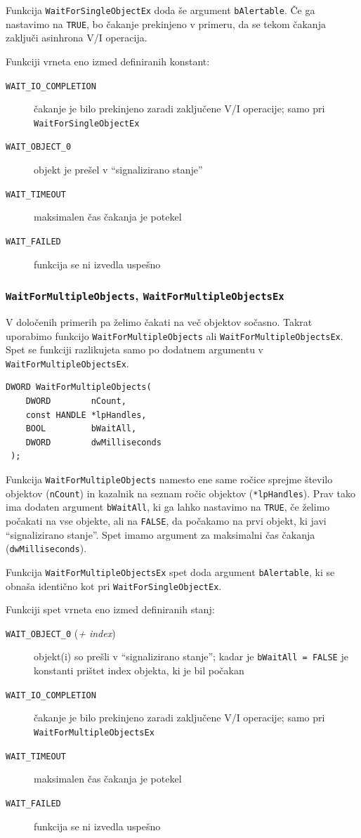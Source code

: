 \documentclass[a4paper,12pt,openright]{book}
\begin{document}
Funkcija \texttt{WaitForSingleObjectEx} doda še argument \texttt{bAlertable}.
Če ga nastavimo na \texttt{TRUE}, bo čakanje prekinjeno v primeru, da se tekom čakanja zaključi asinhrona V/I operacija.

Funkciji vrneta eno izmed definiranih konstant:
\begin{description}
	\item[\texttt{WAIT\_IO\_COMPLETION}] čakanje je bilo prekinjeno zaradi zaključene V/I operacije; samo pri \texttt{WaitForSingleObjectEx}
	\item[\texttt{WAIT\_OBJECT\_0}] objekt je prešel v ``signalizirano stanje''
	\item[\texttt{WAIT\_TIMEOUT}] maksimalen čas čakanja je potekel
	\item[\texttt{WAIT\_FAILED}] funkcija se ni izvedla uspešno
\end{description}

\subsubsection{\texttt{WaitForMultipleObjects}, \texttt{WaitForMultipleObjectsEx}}

V določenih primerih pa želimo čakati na več objektov sočasno.
Takrat uporabimo funkcijo \texttt{WaitForMultipleObjects} ali \texttt{WaitForMultipleObjectsEx}.
Spet se funkciji razlikujeta samo po dodatnem argumentu v \texttt{WaitForMultipleObjectsEx}.

\begin{lstlisting}[style=func]
 DWORD WaitForMultipleObjects(
	DWORD        nCount,
	const HANDLE *lpHandles,
	BOOL         bWaitAll,
	DWORD        dwMilliseconds
 );
\end{lstlisting}

Funkcija \texttt{WaitForMultipleObjects} namesto ene same ročice sprejme število objektov (\texttt{nCount}) in kazalnik na seznam ročic objektov (\texttt{*lpHandles}).
Prav tako ima dodaten argument \texttt{bWaitAll}, ki ga lahko nastavimo na \texttt{TRUE}, če želimo počakati na vse objekte, ali na \texttt{FALSE}, da počakamo na prvi objekt, ki javi ``signalizirano stanje''.
Spet imamo argument za maksimalni čas čakanja (\texttt{dwMilliseconds}).

Funkcija \texttt{WaitForMultipleObjectsEx} spet doda argument \texttt{bAlertable}, ki se obnaša identično kot pri \texttt{WaitForSingleObjectEx}.

Funkciji spet vrneta eno izmed definiranih stanj:
\begin{description}
	\item[\texttt{WAIT\_OBJECT\_0} (\textit{+ index})] objekt(i) so prešli v ``signalizirano stanje''; kadar je \texttt{bWaitAll = FALSE} je konstanti prištet index objekta, ki je bil počakan
	\item[\texttt{WAIT\_IO\_COMPLETION}] čakanje je bilo prekinjeno zaradi zaključene V/I operacije; samo pri \texttt{WaitForMultipleObjectsEx}
	\item[\texttt{WAIT\_TIMEOUT}] maksimalen čas čakanja je potekel
	\item[\texttt{WAIT\_FAILED}] funkcija se ni izvedla uspešno
\end{description}
\end{document}
